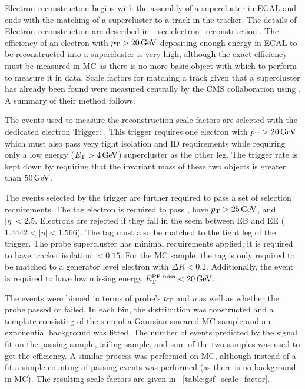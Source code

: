 Electron reconstruction begins with the assembly of a supercluster in ECAL and
ends with the matching of a supercluster to a track in the tracker. The details
of Electron reconstruction are described in
\SEC~\ref{sec:electron_reconstruction}. The efficiency of an electron with $p_{\mathrm{T}}
> 20 \,\text{Ge\hspace{-.08em}V}$ depositing enough energy in ECAL to be reconstructed into a
supercluster is very high, although the exact efficiency must be measured in
MC as there is no more basic object with which to perform \TnP to measure it in
data. Scale factors for matching a track given that a supercluster has already
been found were measured centrally by the CMS collaboration using \TnP
\cite{gsf_scale_factors_2013}. A summary of their method follows.

The events used to measure the reconstruction scale factors are selected with the
dedicated electron \TnP Trigger: \TnPTrigger. This trigger requires one
electron with $p_{\mathrm{T}} > 20 \,\text{Ge\hspace{-.08em}V}$ which must also pass very tight isolation and ID
requirements while requiring only a low energy ($E_{\mathrm{T}} > 4 \,\text{Ge\hspace{-.08em}V}$) supercluster as
the other leg. The trigger rate is kept down by requiring that the invariant
mass of these two objects is greater than $50 \,\text{Ge\hspace{-.08em}V}$.

The events selected by the trigger are further required to pass a set of
selection requirements. The tag electron is required to pass \EGTIGHT, have
$p_{\mathrm{T}} > 25 \,\text{Ge\hspace{-.08em}V}$, and $|\eta| < 2.5$. Electrons are rejected if they fall in the
seem between EB and EE ($1.4442 < |\eta| < 1.566$). The tag must also be
matched to the tight leg of the \TnP trigger. The probe supercluster has
minimal requirements applied; it is required to have tracker isolation $<
0.15$. For the MC sample, the tag is only required to be matched to a generator
level electron with $\Delta R < 0.2$. Additionally, the event is required to
have low \particleflow missing energy $E_{\mathrm{T}}^{\text{PF miss}} < 20 \,\text{Ge\hspace{-.08em}V}$.

The events were binned in terms of probe's $p_{\mathrm{T}}$ and $\eta$ as well as whether
the probe passed or failed. In each bin, the \mee distribution was constructed
and a template consisting of the sum of a Gaussian smeared \Ztoee MC sample and
an exponential background was fitted. The number of events predicted by the
signal fit on the passing sample, failing sample, and sum of the two samples
was used to get the efficiency. A similar process was performed on MC, although
instead of a fit a simple counting of passing events was performed (as there is
no background in MC). The resulting scale factors are given in
\TAB~\ref{table:gsf_scale_factor}.

